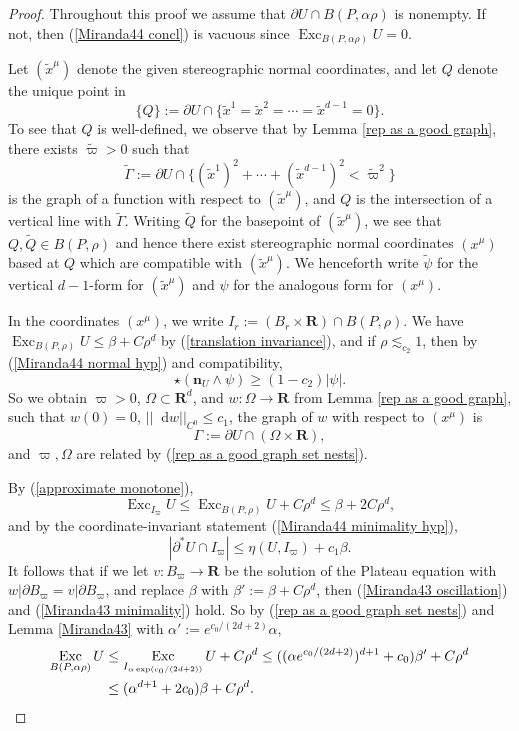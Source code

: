 \documentclass[reqno,10pt]{amsart}
\newcommand{\RR}{\mathbf{R}}
\DeclareMathOperator{\Exc}{Exc}
\newcommand*\dif{\mathop{}\!\mathrm{d}}
\newcommand{\normal}{\mathbf n}
\theoremstyle{definition}
\numberwithin{equation}{section}
\begin{document}
\begin{proof}
Throughout this proof we assume that $\partial U \cap B(P, \alpha \rho)$ is nonempty.
If not, then (\ref{Miranda44 concl}) is vacuous since $\Exc_{B(P, \alpha \rho)} U = 0$.

Let $(\tilde x^\mu)$ denote the given stereographic normal coordinates, and let $Q$ denote the unique point in 
$$\{Q\} := \partial U \cap \{\tilde x^1 = \tilde x^2 = \cdots = \tilde x^{d - 1} = 0\}.$$
To see that $Q$ is well-defined, we observe that by Lemma \ref{rep as a good graph}, there exists $\tilde \varpi > 0$ such that
$$\tilde \Gamma := \partial U \cap \{(\tilde x^1)^2 + \cdots + (\tilde x^{d - 1})^2 < \tilde \varpi^2\}$$
is the graph of a function with respect to $(\tilde x^\mu)$, and $Q$ is the intersection of a vertical line with $\tilde \Gamma$.
Writing $\tilde Q$ for the basepoint of $(\tilde x^\mu)$, we see that $Q, \tilde Q \in B(P, \rho)$ and hence there exist stereographic normal coordinates $(x^\mu)$ based at $Q$ which are compatible with $(\tilde x^\mu)$.
We henceforth write $\tilde \psi$ for the vertical $d-1$-form for $(\tilde x^\mu)$ and $\psi$ for the analogous form for $(x^\mu)$.

In the coordinates $(x^\mu)$, we write $I_r := (B_r \times \RR) \cap B(P, \rho)$.
We have $\Exc_{B(P, \rho)} U \leq \beta + C\rho^d$ by (\ref{translation invariance}), and if $\rho \lesssim_{c_2} 1$, then by (\ref{Miranda44 normal hyp}) and compatibility,
$$\star(\normal_U \wedge \psi) \geq (1 - c_2)|\psi|.$$
So we obtain $\varpi > 0$, $\Omega \subset \RR^d$, and $w: \Omega \to \RR$ from Lemma \ref{rep as a good graph}, such that $w(0) = 0$, $||\dif w||_{C^0} \leq c_1$, the graph of $w$ with respect to $(x^\mu)$ is
$$\Gamma := \partial U \cap (\Omega \times \RR),$$
and $\varpi, \Omega$ are related by (\ref{rep as a good graph set nests}).

By (\ref{approximate monotone}),
$$\Exc_{I_\varpi} U \leq \Exc_{B(P, \rho)} U + C\rho^d \leq \beta + 2C\rho^d,$$
and by the coordinate-invariant statement (\ref{Miranda44 minimality hyp}),
$$|\partial^* U \cap I_\varpi| \leq \eta(U, I_\varpi) + c_1 \beta.$$
It follows that if we let $v: B_\varpi \to \RR$ be the solution of the Plateau equation with $w|\partial B_\varpi = v|\partial B_\varpi$, and replace $\beta$ with $\beta' := \beta + C\rho^d$, then (\ref{Miranda43 oscillation}) and (\ref{Miranda43 minimality}) hold.
So by (\ref{rep as a good graph set nests}) and Lemma \ref{Miranda43} with $\alpha' := e^{c_0/(2d + 2)} \alpha$,
\begin{align*}
\Exc_{B(P, \alpha \rho)} U &\leq \Exc_{I_{\alpha \exp(c_0/(2d + 2))}} U + C\rho^d \leq ((\alpha e^{c_0/(2d + 2)})^{d + 1} + c_0) \beta' + C\rho^d\\
&\leq (\alpha^{d + 1} + 2c_0) \beta + C\rho^d \qedhere.
\end{align*}
\end{proof}
\end{document}
